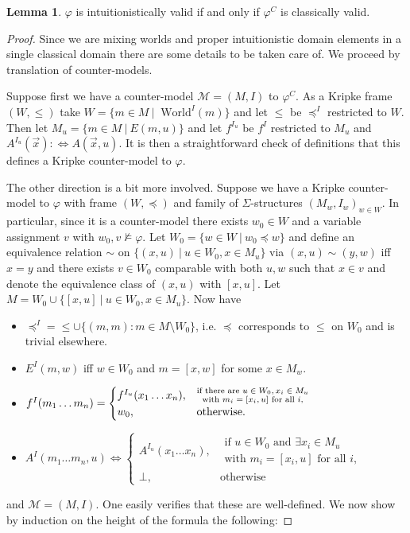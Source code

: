 \documentclass{easychair}
\theoremstyle{definition}
\theoremstyle{definition}
\theoremstyle{definition}
\newtheorem{lemma}[theorem]{Lemma}
\theoremstyle{definition}
\theoremstyle{definition}
\theoremstyle{definition}
\theoremstyle{definition}
\begin{document}
\begin{lemma}\label{proof:fo-simplification}
	$\varphi$ is intuitionistically valid if and only if $\varphi^C$ is classically valid.
\end{lemma}

\begin{proof}
	Since we are mixing worlds and proper intuitionistic domain elements in a single classical domain there are some details to be taken care of. We proceed by translation of counter-models.
	
	Suppose first we have a counter-model $\mathcal M = (M, I)$ to $\varphi^C$. As a Kripke frame $(W, \leq)$ take $ W = \{m\in M\:|\:\text{ World}^I(m)\}$ and let $\leq$ be $\preceq^I$ restricted to $W$. Then let $M_u = \{m\in M\:|\: E(m, u)\}$ and let $f^{I_u}$ be $f^I$ restricted to $M_u$ and $A^{I_u}(\vec x): \Leftrightarrow A(\vec x, u)$. It is then a straightforward check of definitions that this defines a Kripke counter-model to $\varphi$.
	
	The other direction is a bit more involved. Suppose we have a Kripke counter-model to $\varphi$ with frame $(W, \preceq)$ and family of $\Sigma$-structures $(M_w, I_w)_{w\in W}$.
In particular, since it is a counter-model there exists $w_0\in W$ and a variable assignment $v$ with $w_0, v\not\models\varphi$.
Let $W_0 = \{w\in W\:|\: w_0\preceq w\}$ and define an equivalence relation $\sim$ on $\{(x, u)\:|\:u\in W_0, x\in M_u\}$ via $(x, u)\sim (y, w)$ iff $x = y$ and there exists $v\in W_0$ comparable with both $u, w$ such that $x\in v$ and denote the equivalence class of $(x, u)$ with $[x, u]$. Let $M = W_0\cup \{[x, u]\:|\:u\in W_0, x\in M_u\}$.
	Now have
	\begin{itemize}\addtolength{\itemsep}{-5pt}
		\item $\preceq^I = \leq\cup \{(m, m): m\in M\setminus W_0\}$, i.e. $\preceq$ corresponds to $\leq$ on $W_0$ and is trivial elsewhere.
		\item $E^I(m, w)$ iff $w\in W_0$ and $m = [x, w]$ for some $x\in M_w$.
		\item $f^I(m_1\dots m_n) =\begin{cases}
			f^{I_u}(x_1\dots x_n), &\substack{\text{if there are $ u\in W_0, x_i\in M_u$}\\ \text{with $m_i= [x_i, u]$ for all $i$,}}\\
			w_0, & \text{otherwise.}
		\end{cases}$
		\item ${A}^I(m_1\dots m_n, u) \Leftrightarrow\begin{cases}
			A^{I_u}(x_1\dots x_n), &\substack{\text{if $u\in W_0$ and $\exists x_i\in M_u$}\\\text{with $m_i= [x_i, u]$ for all $i$,}}\\
			\bot, & \text{otherwise}
		\end{cases}$
	\end{itemize}
	and $\mathcal M = (M, I)$. One easily verifies that these are well-defined. We now show by induction on the height of the formula the following:
	

\end{proof}
\end{document}
